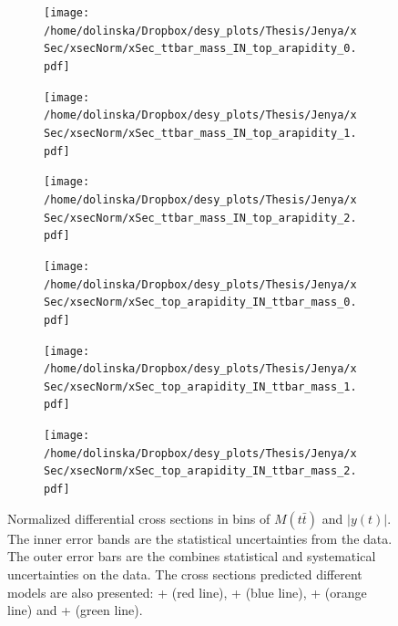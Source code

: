 \begin{figure}
\centering
\begin{subfigure}
  \centering
  \texttt{[image: /home/dolinska/Dropbox/desy\_plots/Thesis/Jenya/xSec/xsecNorm/xSec\_ttbar\_mass\_IN\_top\_arapidity\_0.pdf]}
\end{subfigure}
\begin{subfigure}
  \centering
  \texttt{[image: /home/dolinska/Dropbox/desy\_plots/Thesis/Jenya/xSec/xsecNorm/xSec\_ttbar\_mass\_IN\_top\_arapidity\_1.pdf]}
\end{subfigure}
\begin{subfigure}
  \centering
  \texttt{[image: /home/dolinska/Dropbox/desy\_plots/Thesis/Jenya/xSec/xsecNorm/xSec\_ttbar\_mass\_IN\_top\_arapidity\_2.pdf]}
\end{subfigure}
\begin{subfigure}
  \centering
  \texttt{[image: /home/dolinska/Dropbox/desy\_plots/Thesis/Jenya/xSec/xsecNorm/xSec\_top\_arapidity\_IN\_ttbar\_mass\_0.pdf]}
\end{subfigure}
\begin{subfigure}
  \centering
  \texttt{[image: /home/dolinska/Dropbox/desy\_plots/Thesis/Jenya/xSec/xsecNorm/xSec\_top\_arapidity\_IN\_ttbar\_mass\_1.pdf]}
\end{subfigure}
\begin{subfigure}
  \centering
  \texttt{[image: /home/dolinska/Dropbox/desy\_plots/Thesis/Jenya/xSec/xsecNorm/xSec\_top\_arapidity\_IN\_ttbar\_mass\_2.pdf]}
\end{subfigure}
\caption{Normalized differential cross sections in bins of $M(t\bar{t})$ and $|y(t)|$. The inner error bands are the statistical uncertainties from the data.
         The outer error bars are the combines statistical and systematical uncertainties on the data. The cross sections predicted different models are also presented:
         \MG + \PYTHIA (red line), \Powheg + \PYTHIA (blue line), \Powheg + \HERWIG (orange line) and \MCNLO + \HERWIG (green line).}
\label{fig:XS_2D_Mtt_yt}
\end{figure}

